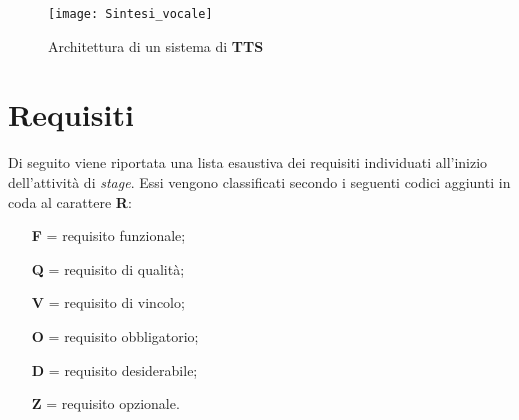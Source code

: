 \begin{figure}[!h] 
    \centering 
    \texttt{[image: Sintesi\_vocale]} 
    \caption{Architettura di un sistema di \textbf{TTS}}
\end{figure}

\newpage

\section{Requisiti}
Di seguito viene riportata una lista esaustiva dei requisiti individuati all'inizio dell'attività di \textit{stage}.
Essi vengono classificati secondo i seguenti codici aggiunti in coda al carattere \textbf{R}:
\begin{enumerate}
    \item[\textbf{F} =] requisito funzionale;
    \item[\textbf{Q} =] requisito di qualità;
    \item[\textbf{V} =] requisito di vincolo;
    \item[\textbf{O} =] requisito obbligatorio;
    \item[\textbf{D} =] requisito desiderabile;
    \item[\textbf{Z} =] requisito opzionale.
\end{enumerate}
